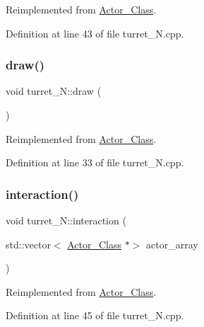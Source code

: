 Reimplemented from \hyperlink{class_actor___class_a9447c6154a674d7e6bdf24ff2874b7a8}{Actor\+\_\+\+Class}.



Definition at line 43 of file turret\+\_\+\+N.\+cpp.

\hypertarget{classturret___n_a2f584be23fc5f0e44fbfda79bc3733b7}{}\label{classturret___n_a2f584be23fc5f0e44fbfda79bc3733b7} 
\subsubsection{\texorpdfstring{draw()}{draw()}}
{\footnotesize\ttfamily void turret\+\_\+\+N\+::draw (\begin{DoxyParamCaption}{ }\end{DoxyParamCaption})\hspace{0.3cm}{\ttfamily [virtual]}}



Reimplemented from \hyperlink{class_actor___class_ac49cd62be76b4b950ecbe155413f1b64}{Actor\+\_\+\+Class}.



Definition at line 33 of file turret\+\_\+\+N.\+cpp.

\hypertarget{classturret___n_a33cfa60542db12f35678ebc3d479491f}{}\label{classturret___n_a33cfa60542db12f35678ebc3d479491f} 
\subsubsection{\texorpdfstring{interaction()}{interaction()}}
{\footnotesize\ttfamily void turret\+\_\+\+N\+::interaction (\begin{DoxyParamCaption}\item[{std\+::vector$<$ \hyperlink{class_actor___class}{Actor\+\_\+\+Class} $\ast$$>$}]{actor\+\_\+array }\end{DoxyParamCaption})\hspace{0.3cm}{\ttfamily [virtual]}}



Reimplemented from \hyperlink{class_actor___class_a87d1e079d8576fa99592a60b38a04a1b}{Actor\+\_\+\+Class}.



Definition at line 45 of file turret\+\_\+\+N.\+cpp.

\hypertarget{classturret___n_aec518dd6dacf05d1af45e6713a15ea5d}{}\label{classturret___n_aec518dd6dacf05d1af45e6713a15ea5d} 
